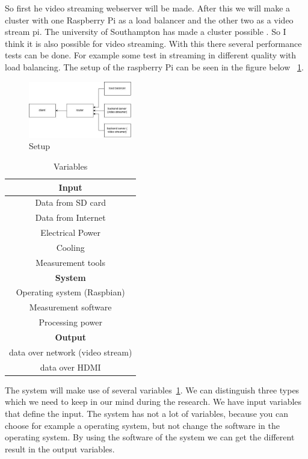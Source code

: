 \documentclass{sig-alternate-br}
\begin{document}
So first he video streaming webserver will be made. 
After this we will make a cluster with one Raspberry Pi as a load balancer and the other two as a video stream pi. The university of Southampton has made a cluster possible \cite{southampton}. So I think it is also possible for video streaming. With this there several performance tests can be done. For example some test in streaming in different quality with load balancing. The setup of the raspberry Pi can be seen in the figure below ~\ref{fig:setup}.

\begin{figure}[H]
\centering 
\includegraphics[width=0.4\textwidth]{raspberry pi setup.jpg}
\caption{Setup}
\label{fig:setup} %
\end{figure}

\begin{table}[H]
	\centering \caption{Variables}
	\begin{tabular}{|c|} \hline
		\textbf{Input}  \\ \hline
		Data from SD card \\ \hline
		Data from Internet \\ \hline
		Electrical Power \\ \hline
		Cooling \\ \hline
		Measurement tools \\ \hline
		\textbf{System}  \\ \hline
		Operating system (Raspbian) \\ \hline
		Measurement software \\ \hline
		Processing power \\ \hline
	\textbf{Output} \\ \hline
		data  over network (video stream)\\ \hline
		data over HDMI \\ \hline
	\end{tabular}
	\label{tab:variables}

\end{table}
The system will make use of several variables~\ref{tab:variables}. We can distinguish three types which we need to keep in our mind during the research. We have input variables that define the input. The system has not a lot of variables, because you can choose for example a operating system, but not change the software in the operating system. By using the software of the system we can get the different result in the output variables. 
\end{document}
